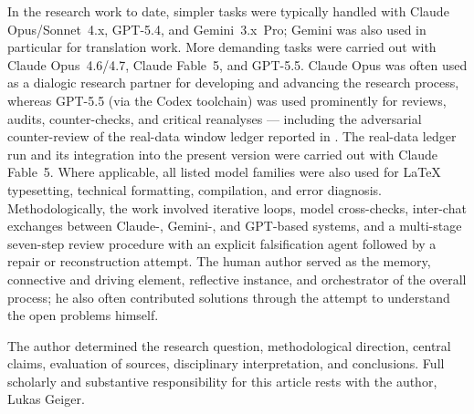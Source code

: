 \documentclass[12pt,a4paper]{article}
\theoremstyle{definition}
\theoremstyle{remark}
\begin{document}
\begin{sloppypar}
\noindent
In the research work to date, simpler tasks were typically handled with
Claude Opus/Sonnet~4.x, GPT-5.4, and Gemini~3.x~Pro; Gemini was also used in
particular for translation work. More demanding tasks were carried out with
Claude Opus~4.6/4.7, Claude Fable~5, and GPT-5.5. Claude Opus was often used
as a dialogic research partner for developing and advancing the research
process, whereas GPT-5.5 (via the Codex toolchain) was used prominently for
reviews, audits, counter-checks, and critical reanalyses --- including the
adversarial counter-review of the real-data window ledger reported in
. The real-data ledger run and its integration
into the present version were carried out with Claude Fable~5. Where
applicable, all listed model families were also used for \LaTeX{}
typesetting, technical formatting, compilation, and error diagnosis.
Methodologically, the work involved iterative loops, model cross-checks,
inter-chat exchanges between Claude-, Gemini-, and GPT-based systems, and a
multi-stage seven-step review procedure with an explicit falsification agent
followed by a repair or reconstruction attempt. The human author served as
the memory, connective and driving element, reflective instance, and
orchestrator of the overall process; he also often contributed solutions
through the attempt to understand the open problems himself.
\end{sloppypar}

\medskip

\noindent
The author determined the research question, methodological direction,
central claims, evaluation of sources, disciplinary interpretation, and
conclusions. Full scholarly and substantive responsibility for this article
rests with the author, Lukas Geiger.

\normalsize

\end{document}
